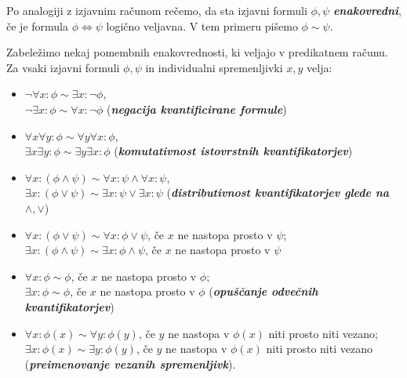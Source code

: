 \documentclass[11pt]{book}
\def\definicija{\color{rdeca}\bf\em}
\theoremstyle{definition}
\theoremstyle{zgled}
\theoremstyle{odprtproblem}
\theoremstyle{domacanaloga}
\theoremstyle{izrek}
\begin{document}
Po analogiji z izjavnim računom rečemo, da sta izjavni formuli $\phi, \psi$ {\definicija enakovredni}, če je formula $\phi \Leftrightarrow \psi$ logično veljavna. V tem primeru pišemo $\phi \sim \psi$.

Zabeležimo nekaj pomembnih enakovrednosti, ki veljajo v predikatnem računu. Za vsaki izjavni formuli $\phi, \psi$ in individualni spremenljivki $x,y$ velja:
\begin{itemize}
    \item $\lnot \forall x \colon \phi \sim \exists x \colon \lnot \phi$, \\ $\lnot \exists x \colon \phi \sim \forall x \colon \lnot \phi$ ({\definicija negacija kvantificirane formule}) 
    \item $\forall x \forall y \colon \phi \sim \forall y \forall x \colon \phi$, \\ $\exists x \exists y \colon \phi \sim \exists y \exists x \colon \phi$ ({\definicija komutativnost istovrstnih kvantifikatorjev})
    \item $\forall x \colon (\phi \land \psi) \sim \forall x \colon \psi \land \forall x \colon \psi$, \\ $\exists x \colon (\phi \lor \psi) \sim \exists x \colon \psi \lor \exists x \colon \psi$ ({\definicija distributivnost kvantifikatorjev glede na $\land, \lor$})
    \item $\forall x \colon (\phi \lor \psi) \sim \forall x \colon \phi \lor \psi$, če $x$ ne nastopa prosto v $\psi$; \\ $\exists x \colon (\phi \land \psi) \sim \exists x \colon \phi \land \psi$, če $x$ ne nastopa prosto v $\psi$
    \item $\forall x \colon \phi \sim \phi$, če $x$ ne nastopa prosto v $\phi$; \\ $\exists x \colon \phi \sim \phi$, če $x$ ne nastopa prosto v $\phi$ ({\definicija opuščanje odvečnih kvantifikatorjev})
    \item $\forall x \colon \phi(x) \sim \forall y \colon \phi(y)$, če $y$ ne nastopa v $\phi(x)$ niti prosto niti vezano; \\ $\exists x \colon \phi(x) \sim \exists y \colon \phi(y)$, če $y$ ne nastopa v $\phi(x)$ niti prosto niti vezano ({\definicija preimenovanje vezanih spremenljivk}).
\end{itemize}
\end{document}
